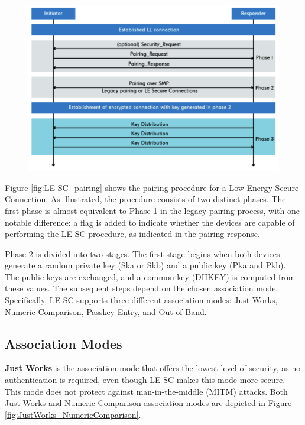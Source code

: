 \documentclass{Configuration_Files/PoliMi3i_thesis}
\begin{document}
\begin{figure}[H]
    \centering
    \includegraphics[scale=0.7]{Bluetooth_Security/4.png}
    \label{fig:pairing_procedure}
\end{figure}

Figure \ref{fig:LE-SC_pairing} shows the pairing procedure for a Low Energy Secure Connection. As illustrated, the procedure consists of two distinct phases. The first phase is almost equivalent to Phase 1 in the legacy pairing process, with one notable difference: a flag is added to indicate whether the devices are capable of performing the LE-SC procedure, as indicated in the pairing response. 

Phase 2 is divided into two stages. The first stage begins when both devices generate a random private key (Ska or Skb) and a public key (Pka and Pkb). The public keys are exchanged, and a common key (DHKEY) is computed from these values. The subsequent steps depend on the chosen association mode. Specifically, LE-SC supports three different association modes: Just Works, Numeric Comparison, Passkey Entry, and Out of Band.

\subsection{Association Modes}

\textbf{Just Works} is the association mode that offers the lowest level of security, as no authentication is required, even though LE-SC makes this mode more secure. This mode does not protect against man-in-the-middle (MITM) attacks. Both Just Works and Numeric Comparison association modes are depicted in Figure \ref{fig:JustWorks_NumericComparison}.
\end{document}
